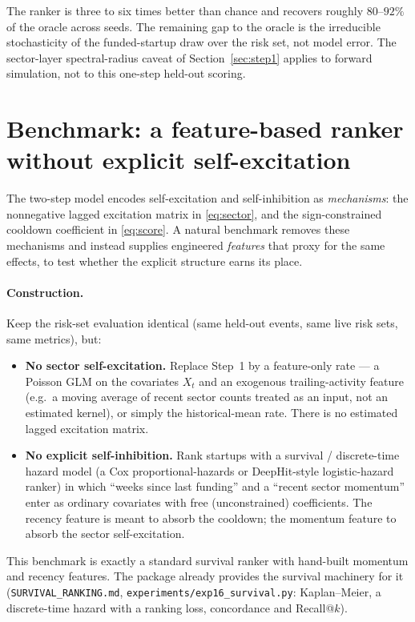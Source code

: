 \documentclass[11pt]{article}
\newcommand{\code}[1]{\texttt{#1}}
\begin{document}
The ranker is three to six times better than chance and recovers roughly $80$--$92\%$ of
the oracle across seeds. The remaining gap to the oracle is the irreducible stochasticity
of the funded-startup draw over the risk set, not model error. The sector-layer
spectral-radius caveat of Section~\ref{sec:step1} applies to forward simulation, not to
this one-step held-out scoring.

\section{Benchmark: a feature-based ranker without explicit self-excitation}
\label{sec:bench}

The two-step model encodes self-excitation and self-inhibition as \emph{mechanisms}: the
nonnegative lagged excitation matrix in \eqref{eq:sector}, and the sign-constrained
cooldown coefficient in \eqref{eq:score}. A natural benchmark removes these mechanisms
and instead supplies engineered \emph{features} that proxy for the same effects, to test
whether the explicit structure earns its place.

\paragraph{Construction.} Keep the risk-set evaluation identical (same held-out events,
same live risk sets, same metrics), but:
\begin{itemize}[leftmargin=1.4em,itemsep=2pt]
\item \textbf{No sector self-excitation.} Replace Step~1 by a feature-only rate --- a
Poisson GLM on the covariates $X_t$ and an exogenous trailing-activity feature (e.g.\ a
moving average of recent sector counts treated as an input, not an estimated kernel), or
simply the historical-mean rate. There is no estimated lagged excitation matrix.
\item \textbf{No explicit self-inhibition.} Rank startups with a survival / discrete-time
hazard model (a Cox proportional-hazards or DeepHit-style logistic-hazard ranker) in which
``weeks since last funding'' and a ``recent sector momentum'' enter as ordinary
covariates with free (unconstrained) coefficients. The recency feature is meant to absorb
the cooldown; the momentum feature to absorb the sector self-excitation.
\end{itemize}
This benchmark is exactly a standard survival ranker with hand-built momentum and recency
features. The package already provides the survival machinery for it
(\code{SURVIVAL\_RANKING.md}, \code{experiments/exp16\_survival.py}: Kaplan--Meier, a
discrete-time hazard with a ranking loss, concordance and Recall@$k$).
\end{document}
